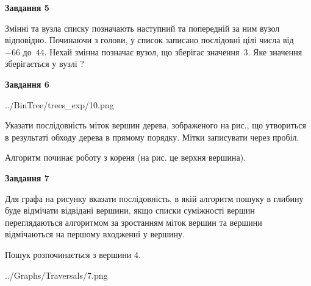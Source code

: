 \documentclass[12pt, ukrainian]{article}
\begin{document}
{\begin {large}
{\begin {center}\textbf{Завдання 5}\end {center}}\par
Змінні  та  вузла списку позначають наступний та попередній за ним вузол відповідно. Починаючи з голови, у список записано послідовні цілі числа від~$-66$ до~$44$. Нехай змінна  позначає вузол, що зберігає значення~$3$.
Яке значення зберігається у вузлі  ?\par
\newpage

{\begin {center}\textbf{Завдання 6}\end {center}}\par

\begin{center}
	{../BinTree/trees_exp/10.png}
\end{center}
Указати послідовність міток вершин дерева, зображеного на рис., що утвориться в результаті обходу дерева в прямому порядку. Мітки записувати через пробіл.\par Алгоритм починає роботу з кореня (на рис. це верхня вершина).\par
\newpage

{\begin {center}\textbf{Завдання 7}\end {center}}\par
Для графа на рисунку вказати послідовність, в якій алгоритм пошуку в глибину буде відмічати відвідані вершини, якщо списки суміжності вершин переглядаються алгоритмом за зростанням міток вершин та вершини відмічаються на першому вход\-женні у вершину.\par
Пошук розпочинається з вершини 4.\par

\begin{center}
	{../Graphs/Traversals/7.png}
\end{center}\par
\newpage


\end{large}}
\end{document}
